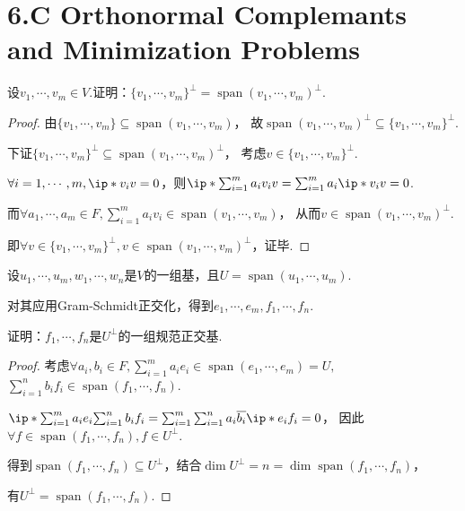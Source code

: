 \section{6.C Orthonormal Complemants and Minimization Problems}

\begin{problem}[1]\label{6.C.1}
    设\(v_1,\cdots,v_m \in V\).证明：\(\{v_1,\cdots,v_m\}^\bot=\operatorname{span}(v_1,\cdots,v_m)^\bot\).
\end{problem}

\begin{proof}
    由\(\{v_1,\cdots,v_m\} \subseteq \operatorname{span}(v_1,\cdots,v_m)\)，
    故\(\operatorname{span}(v_1,\cdots,v_m)^\bot \subseteq \{v_1,\cdots,v_m\}^\bot\).
    
    下证\(\{v_1,\cdots,v_m\}^\bot \subseteq \operatorname{span}(v_1,\cdots,v_m)^\bot\)，
    考虑\(v \in \{v_1,\cdots,v_m\}^\bot\).
    
    \(\forall i=1,\cdots,m,\ip*{v_i}{v}=0\)，则\(\ip*{\sum_{i=1}^m a_iv_i}{v}=\sum_{i=1}^m a_i\ip*{v_i}{v}=0\).
    
    而\(\forall a_1,\cdots,a_m \in F,\sum_{i=1}^m a_iv_i \in \operatorname{span}(v_1,\cdots,v_m)\)，
    从而\(v \in \operatorname{span}(v_1,\cdots,v_m)^\bot\).
    
    即\(\forall v \in \{v_1,\cdots,v_m\}^\bot,v \in \operatorname{span}(v_1,\cdots,v_m)^\bot\)，证毕.    
\end{proof}

\begin{problem}[3]\label{6.C.3}
    设\(u_1,\cdots,u_m,w_1,\cdots,w_n\)是\(V\)的一组基，且\(U=\operatorname{span}(u_1,\cdots,u_m)\).

    对其应用Gram-Schmidt正交化，得到\(e_1,\cdots,e_m,f_1,\cdots,f_n\).
    
    证明：\(f_1,\cdots,f_n\)是\(U^\bot\)的一组规范正交基.
\end{problem}

\begin{proof}
    考虑\(\forall a_i,b_i \in F,\sum_{i=1}^m a_ie_i \in \operatorname{span}(e_1,\cdots,e_m)=U,\)
    \(\sum_{i=1}^n b_if_i \in \operatorname{span}(f_1,\cdots,f_n)\).
    
    \(\ip*{\sum_{i=1}^m a_ie_i}{\sum_{i=1}^n b_if_i}=\sum_{i=1}^m \sum_{i=1}^n a_i\ol{b_i} \ip*{e_i}{f_i}=0\)，
    因此\(\forall f \in \operatorname{span}(f_1,\cdots,f_n), f\in U^\bot\).
    
    得到\(\operatorname{span}(f_1,\cdots,f_n) \subseteq U^\bot\)，结合\(\dim U^\bot=n=\dim \operatorname{span}(f_1,\cdots,f_n)\)，
    
    有\(U^\bot=\operatorname{span}(f_1,\cdots,f_n)\).
\end{proof}


